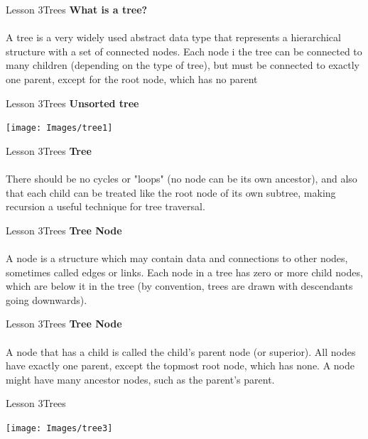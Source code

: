 \documentclass[aspectratio=1610]{beamer}
\begin{document}
\begin{frame}{Lesson 3}{Trees}
\LARGE
\textbf{What is a tree?}\\~\\
A tree is a very widely used abstract data type that represents a
hierarchical structure with a set of connected nodes. Each node i
the tree can be connected to many children (depending on the type of
tree), but must be connected to exactly one parent, except for the
root node, which has no parent
\end{frame}


\begin{frame}{Lesson 3}{Trees}
\LARGE
\textbf{Unsorted tree}\\
\begin{center}
\texttt{[image: Images/tree1]}
\end{center}
\end{frame}


\begin{frame}{Lesson 3}{Trees}
\LARGE
\textbf{Tree}\\~\\
There should be no cycles or "loops" (no node can be its own
ancestor), and also that each child can be treated like the root
node of its own subtree, making recursion a useful technique for
tree traversal.	
\end{frame}

\begin{frame}{Lesson 3}{Trees}
\LARGE
\textbf{Tree Node}\\~\\
A node is a structure which may contain data and connections to
other nodes, sometimes called edges or links. Each node in a tree
has zero or more child nodes, which are below it in the tree (by
convention, trees are drawn with descendants going downwards).
\end{frame}


\begin{frame}{Lesson 3}{Trees}
\LARGE
\textbf{Tree Node}\\~\\
A node that has a child is called the child's parent node (or
superior). All nodes have exactly one parent, except the topmost
root node, which has none. A node might have many ancestor nodes,
such as the parent's parent.
\end{frame}


\begin{frame}{Lesson 3}{Trees}
\begin{center}
\texttt{[image: Images/tree3]}
\end{center}
\end{frame}
\end{document}
